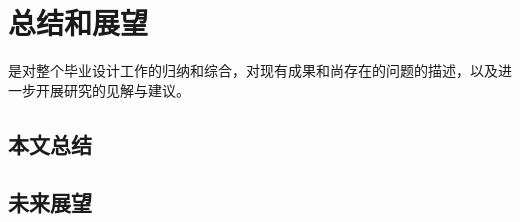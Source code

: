 

\chapter{总结和展望 }
是对整个毕业设计工作的归纳和综合，对现有成果和尚存在的问题的描述，以及进一步开展研究的见解与建议。

\section{本文总结}
 
\section{未来展望}
 




